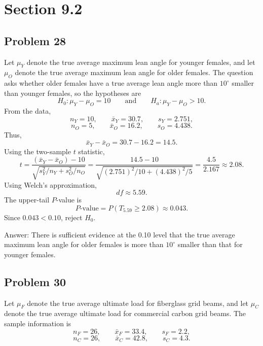\documentclass[11pt]{article}
\begin{document}
\section*{Section 9.2}

\subsection*{Problem 28}

Let $\mu_Y$ denote the true average maximum lean angle for younger females, and let $\mu_O$ denote the true average maximum lean angle for older females. The question asks whether older females have a true average lean angle more than $10^\circ$ smaller than younger females, so the hypotheses are
\[
H_0:\mu_Y-\mu_O=10
\qquad \text{and} \qquad
H_a:\mu_Y-\mu_O>10.
\]
From the data,
\[
n_Y=10,
\qquad \bar{x}_Y=30.7,
\qquad s_Y=2.751,
\]
\[
n_O=5,
\qquad \bar{x}_O=16.2,
\qquad s_O=4.438.
\]
Thus,
\[
\bar{x}_Y-\bar{x}_O=30.7-16.2=14.5.
\]
Using the two-sample $t$ statistic,
\[
t=\frac{(\bar{x}_Y-\bar{x}_O)-10}{\sqrt{s_Y^2/n_Y+s_O^2/n_O}}
=\frac{14.5-10}{\sqrt{(2.751)^2/10+(4.438)^2/5}}
=\frac{4.5}{2.167}
\approx 2.08.
\]
Using Welch's approximation,
\[
df\approx 5.59.
\]
The upper-tail $P$-value is
\[
P\text{-value}=P(T_{5.59}\ge 2.08)\approx 0.043.
\]
Since $0.043<0.10$, reject $H_0$.

Answer: There is sufficient evidence at the 0.10 level that the true average maximum lean angle for older females is more than $10^\circ$ smaller than that for younger females.

\subsection*{Problem 30}

Let $\mu_F$ denote the true average ultimate load for fiberglass grid beams, and let $\mu_C$ denote the true average ultimate load for commercial carbon grid beams. The sample information is
\[
n_F=26,
\qquad \bar{x}_F=33.4,
\qquad s_F=2.2,
\]
\[
n_C=26,
\qquad \bar{x}_C=42.8,
\qquad s_C=4.3.
\]
\end{document}
